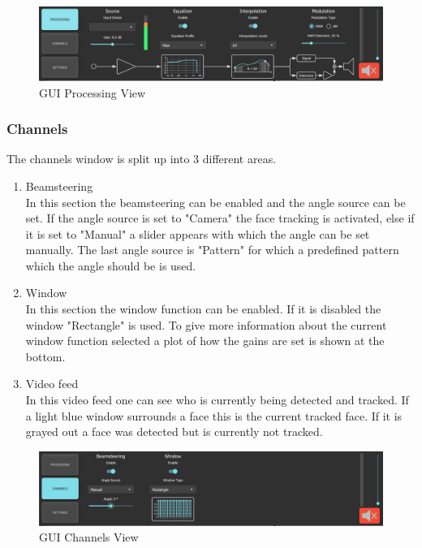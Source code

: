 \begin{figure}[h!]
    \centering
    \includegraphics[width=\textwidth]{images/4_Design/GUI_Processing.JPG}
    \caption{GUI Processing View}
    \label{4_fig:gui_processing}
\end{figure}

\subsubsection{Channels}
The channels window is split up into 3 different areas.
\begin{enumerate}
    \item Beamsteering \\
    In this section the beamsteering can be enabled and the angle source can be set. If the angle source is set to "Camera" the face tracking is activated, else if it is set to "Manual" a slider appears with which the angle can be set manually. The last angle source is "Pattern" for which a predefined pattern which the angle should be is used. 
    \item Window \\
    In this section the window function can be enabled. If it is disabled the window "Rectangle" is used. To give more information about the current window function selected a plot of how the gains are set is shown at the bottom. 
    \item Video feed \\
    In this video feed one can see who is currently being detected and tracked. If a light blue window surrounds a face this is the current tracked face. If it is grayed out a face was detected but is currently not tracked.
\end{enumerate}
\begin{figure}[h!]
    \centering
    \includegraphics[width=\textwidth]{images/4_Design/GUI_Channels.JPG}
    \caption{GUI Channels View}
    \label{4_fig:gui_channels}
\end{figure}

